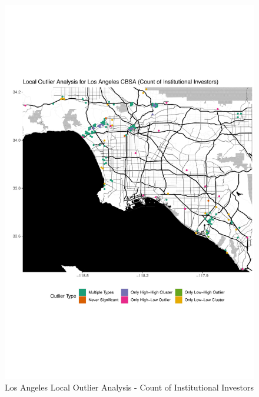 \begin{figure}
	\centering
	\includegraphics[width=1\linewidth]{Figures/ChapterIV/LA_Count_LO}
	\caption[Los Angeles CBSA Local Outlier Analysis - Count of Institutional Investors 1999-2018]{Los Angeles Local Outlier Analysis - Count of Institutional Investors}
	\label{fig:LAcountlocaloutliercount}
\end{figure}	

